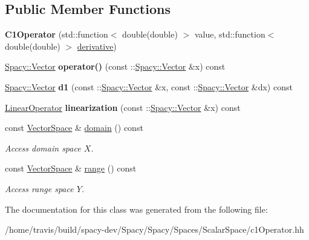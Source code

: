 \subsection*{Public Member Functions}
\begin{DoxyCompactItemize}
\item 
\hypertarget{classSpacy_1_1Scalar_1_1C1Operator_a88127af1231ebe28124f2af4bf92238a}{{\bfseries C1\-Operator} (std\-::function$<$ double(double) $>$ value, std\-::function$<$ double(double) $>$ \hyperlink{namespaceSpacy_a002fe344fa6d04a6ac59a74ea25fddb6}{derivative})}\label{classSpacy_1_1Scalar_1_1C1Operator_a88127af1231ebe28124f2af4bf92238a}

\item 
\hypertarget{classSpacy_1_1Scalar_1_1C1Operator_a9ab2d8a905a70dd848c984e532b50fed}{\hyperlink{classSpacy_1_1Vector}{Spacy\-::\-Vector} {\bfseries operator()} (const \-::\hyperlink{classSpacy_1_1Vector}{Spacy\-::\-Vector} \&x) const }\label{classSpacy_1_1Scalar_1_1C1Operator_a9ab2d8a905a70dd848c984e532b50fed}

\item 
\hypertarget{classSpacy_1_1Scalar_1_1C1Operator_a56908ac8a9cd1e959f15e3f71a00a01b}{\hyperlink{classSpacy_1_1Vector}{Spacy\-::\-Vector} {\bfseries d1} (const \-::\hyperlink{classSpacy_1_1Vector}{Spacy\-::\-Vector} \&x, const \-::\hyperlink{classSpacy_1_1Vector}{Spacy\-::\-Vector} \&dx) const }\label{classSpacy_1_1Scalar_1_1C1Operator_a56908ac8a9cd1e959f15e3f71a00a01b}

\item 
\hypertarget{classSpacy_1_1Scalar_1_1C1Operator_acefccd4cac61750dad6053a963b10944}{\hyperlink{structSpacy_1_1Scalar_1_1LinearOperator}{Linear\-Operator} {\bfseries linearization} (const \-::\hyperlink{classSpacy_1_1Vector}{Spacy\-::\-Vector} \&x) const }\label{classSpacy_1_1Scalar_1_1C1Operator_acefccd4cac61750dad6053a963b10944}

\item 
\hypertarget{classSpacy_1_1OperatorBase_a2588f9b3e0188820c4c494e63293dc6f}{const \hyperlink{classSpacy_1_1VectorSpace}{Vector\-Space} \& \hyperlink{classSpacy_1_1OperatorBase_a2588f9b3e0188820c4c494e63293dc6f}{domain} () const }\label{classSpacy_1_1OperatorBase_a2588f9b3e0188820c4c494e63293dc6f}

\begin{DoxyCompactList}\small\item\em Access domain space $X$. \end{DoxyCompactList}\item 
\hypertarget{classSpacy_1_1OperatorBase_ab19d3b7a6f290b1079248f1e567e53d6}{const \hyperlink{classSpacy_1_1VectorSpace}{Vector\-Space} \& \hyperlink{classSpacy_1_1OperatorBase_ab19d3b7a6f290b1079248f1e567e53d6}{range} () const }\label{classSpacy_1_1OperatorBase_ab19d3b7a6f290b1079248f1e567e53d6}

\begin{DoxyCompactList}\small\item\em Access range space $Y$. \end{DoxyCompactList}\end{DoxyCompactItemize}


The documentation for this class was generated from the following file\-:\begin{DoxyCompactItemize}
\item 
/home/travis/build/spacy-\/dev/\-Spacy/\-Spacy/\-Spaces/\-Scalar\-Space/c1\-Operator.\-hh\end{DoxyCompactItemize}
